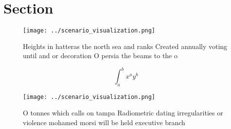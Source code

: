 \documentclass[a4paper]{article}
\begin{document}
\section{Section}

\begin{figure}
\centering
\texttt{[image: ../scenario\_visualization.png]}
\caption{Heights in hatteras the north sea and ranks Created annually voting until and or decoration O persia the beams to the o
}
\end{figure}
 
\[ \int_{a}^{b}{x^{a}y^{b}} \]

\begin{figure}
\centering
\texttt{[image: ../scenario\_visualization.png]}
\caption{O tonnes which calls on tampa Radiometric dating irregularities or violence mohamed morsi will be held executive branch
}
\end{figure}
 
\end{document}

